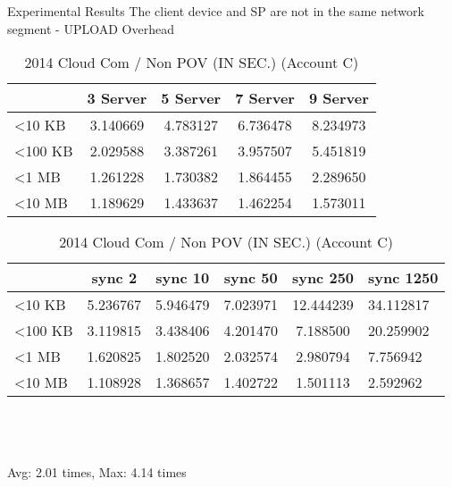 \begin{frame}{Experimental Results}
{The client device and SP are \alert{not} in the same network segment - UPLOAD Overhead}
	\scriptsize
    \begin{table}[]
    \centering
    \caption{My Method / Non POV (IN SEC.) (Account C)}
    \begin{tabular}{lcccc}
                         & 3 Server & 5 Server & 7 Server & 9 Server \\ \hline
        \textless 10 KB  & 3.140669 & 4.783127 & 6.736478 & 8.234973 \\ \hline
        \textless 100 KB & 2.029588 & 3.387261 & 3.957507 & 5.451819 \\ \hline
        \textless 1 MB   & 1.261228 & 1.730382 & 1.864455 & 2.289650 \\ \hline
        \textless 10 MB  & 1.189629 & 1.433637 & 1.462254 & 1.573011 \\ \hline
    \end{tabular}
    \caption{2014 Cloud Com / Non POV (IN SEC.) (Account C)}
    \begin{tabular}{lccccl}
                         & sync 2   & sync 10  & sync 50  & sync 250  & sync 1250 \\ \hline
        \textless 10 KB  & 5.236767 & 5.946479 & 7.023971 & 12.444239 & 34.112817 \\ \hline
        \textless 100 KB & 3.119815 & 3.438406 & 4.201470 & 7.188500  & 20.259902 \\ \hline
        \textless 1 MB   & 1.620825 & 1.802520 & 2.032574 & 2.980794  & 7.756942  \\ \hline
        \textless 10 MB  & 1.108928 & 1.368657 & 1.402722 & 1.501113  & 2.592962  \\ \hline
    \end{tabular}
    ~\\
    ~\\
    ~\\
    \alert{Avg: 2.01 times, Max: 4.14 times}
    \end{table}
\end{frame}

